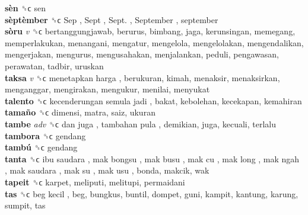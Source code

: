\textbf{sèn} ␝ϲ  sen  \\
\textbf{sèptèmber} ␝ϲ   Sep ,  Sept ,  Sept. ,  September , september  \\
\textbf{sòru} \emph{v}  ␝ϲ  bertanggungjawab, berurus, bimbang, jaga, kerunsingan, memegang, memperlakukan, menangani, mengatur, mengelola, mengelolakan, mengendalikan, mengerjakan, mengurus, mengusahakan, menjalankan, peduli, pengawasan, perawatan, tadbir, uruskan  \\
\textbf{taksa} \emph{v}  ␝ϲ   menetapkan harga , berukuran, kimah, menaksir, menaksirkan, menganggar, mengirakan, mengukur, menilai, menyukat  \\
\textbf{talento} ␝ϲ   kecenderungan semula jadi , bakat, kebolehan, kecekapan, kemahiran  \\
\textbf{tamaño} ␝ϲ  dimensi, matra, saiz, ukuran  \\
\textbf{tambe} \emph{adv}  ␝ϲ   dan juga ,  tambahan pula , demikian, juga, kecuali, terlalu  \\
\textbf{tambora} ␝ϲ  gendang  \\
\textbf{tambú} ␝ϲ  gendang  \\
\textbf{tanta} ␝ϲ   ibu saudara ,  mak bongsu ,  mak busu ,  mak cu ,  mak long ,  mak ngah ,  mak saudara ,  mak su ,  mak usu , bonda, makcik, wak  \\
\textbf{tapeit} ␝ϲ  karpet, meliputi, melitupi, permaidani  \\
\textbf{tas} ␝ϲ   beg kecil , beg, bungkus, buntil, dompet, guni, kampit, kantung, karung, sumpit, tas  \\
